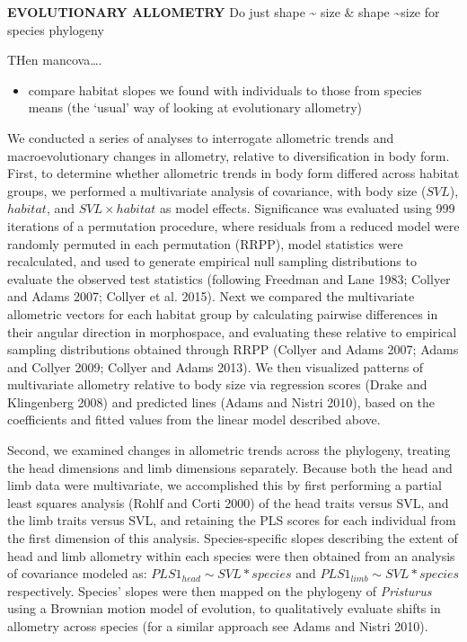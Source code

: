 \documentclass[
]{article}
\providecommand{\tightlist}{%
  \setlength{\itemsep}{0pt}\setlength{\parskip}{0pt}}
\begin{document}
\textbf{EVOLUTIONARY ALLOMETRY} Do just shape \textasciitilde{} size \&
shape \textasciitilde size for species \textbar{} phylogeny

THen mancova\ldots.

\begin{itemize}
\tightlist
\item
  compare habitat slopes we found with individuals to those from species
  means (the `usual' way of looking at evolutionary allometry)
\end{itemize}

We conducted a series of analyses to interrogate allometric trends and
macroevolutionary changes in allometry, relative to diversification in
body form. First, to determine whether allometric trends in body form
differed across habitat groups, we performed a multivariate analysis of
covariance, with body size (\(SVL\)), \(habitat\), and
\(SVL\times habitat\) as model effects. Significance was evaluated using
999 iterations of a permutation procedure, where residuals from a
reduced model were randomly permuted in each permutation (RRPP), model
statistics were recalculated, and used to generate empirical null
sampling distributions to evaluate the observed test statistics
(following Freedman and Lane 1983; Collyer and Adams 2007; Collyer et
al. 2015). Next we compared the multivariate allometric vectors for each
habitat group by calculating pairwise differences in their angular
direction in morphospace, and evaluating these relative to empirical
sampling distributions obtained through RRPP (Collyer and Adams 2007;
Adams and Collyer 2009; Collyer and Adams 2013). We then visualized
patterns of multivariate allometry relative to body size via regression
scores (Drake and Klingenberg 2008) and predicted lines (Adams and
Nistri 2010), based on the coefficients and fitted values from the
linear model described above. \hfill\break

Second, we examined changes in allometric trends across the phylogeny,
treating the head dimensions and limb dimensions separately. Because
both the head and limb data were multivariate, we accomplished this by
first performing a partial least squares analysis (Rohlf and Corti 2000)
of the head traits versus SVL, and the limb traits versus SVL, and
retaining the PLS scores for each individual from the first dimension of
this analysis. Species-specific slopes describing the extent of head and
limb allometry within each species were then obtained from an analysis
of covariance modeled as: \(PLS1_{head} \sim SVL*species\) and
\(PLS1_{limb} \sim SVL*species\) respectively. Species' slopes were then
mapped on the phylogeny of \emph{Pristurus} using a Brownian motion
model of evolution, to qualitatively evaluate shifts in allometry across
species (for a similar approach see Adams and Nistri 2010). \hfill\break
\end{document}
